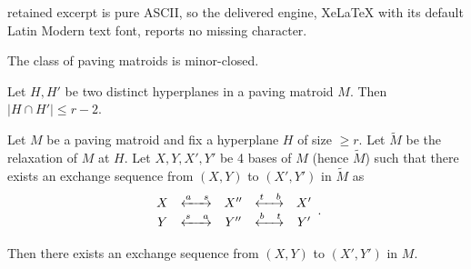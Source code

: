 \documentclass[10pt,a4paper]{amsart}
\newcommand{\swap}[2]{\xleftrightarrow{#1 \quad #2}}
\begin{document}
retained excerpt is pure ASCII, so the delivered engine, XeLaTeX with its default Latin Modern text font, reports no missing character.
\begin{proposition} \label{prop:minor-closed}
    The class of paving matroids is minor-closed.
\end{proposition}

\begin{proposition} \label{prop:SH_intersection}
    Let $H,H'$ be two distinct hyperplanes in a paving matroid $M$. Then $|H\cap H'|\leq r-2$.
\end{proposition}

\begin{proposition} \label{prop:XY_XY}
    Let $M$ be a paving matroid and fix a hyperplane $H$ of size $\geq r$. Let $\widetilde{M}$ be the relaxation of $M$ at $H$. Let $X,Y,X',Y'$ be 4 bases of $M$ (hence $\widetilde{M}$) such that there exists an exchange sequence from $(X,Y)$ to $(X',Y')$ in $\widetilde{M}$ as
\begin{equation} \label{eq:deg2}
\begin{array}{c c c c c}
   X   & \swap{a}{s} & X'' & \swap{t}{b} & X'\\
   Y   & \swap{s}{a} & Y'' & \swap{b}{t} & Y'
\end{array}.
\end{equation}


Then there exists an exchange sequence from $(X,Y)$ to $(X',Y')$ in $M$.
\end{proposition} 
\end{document}
